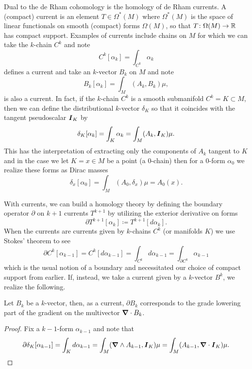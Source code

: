\documentclass[conf]{new-aiaa}
\begin{document}
Dual to the de Rham cohomology is the homology of de Rham currents. A (compact) current is an element $T\in \Omega^*(M)$ where $\Omega^*(M)$ is the space of linear functionals on smooth (compact) forms $\Omega(M)$, so that $T\colon \Omega(M)\to \mathbb{R}$ has compact support. Examples of currents include chains on $M$ for which we can take the $k$-chain $C^k$ and note
\begin{equation}
    C^k[\alpha_k] = \int_{C^k} \alpha_k
\end{equation}
defines a current and take an $k$-vector $B_{k}$ on $M$ and note
\begin{equation}
    B_k[\alpha_k] = \int_M (A_k,B_k) \mu,
\end{equation}
is also a current. In fact, if the $k$-chain $C^k$ is a smooth submanifold $C^k=K\subset M$, then we can define the distributional $k$-vector $\delta_K$ so that it coincides with the tangent pseudoscalar $\boldsymbol{I}_K$ by
\begin{equation}
\delta_K[\alpha_k] = \int_{K} \alpha_k = \int_{M} (A_k, \boldsymbol{I}_K)\mu.
\end{equation}
This has the interpretation of extracting only the components of $A_k$ tangent to $K$ and in the case we let $K=x\in M$ be a point (a $0$-chain) then for a $0$-form $\alpha_0$ we realize these forms as Dirac masses
\begin{equation}
\delta_x[\alpha_0] = \int_M (A_0,\delta_x) \mu = A_0(x).
\end{equation}

With currents, we can build a homology theory \cite{iversen_cauchy_1989} by defining the boundary operator $\partial$ on $k+1$ currents $T^{k+1}$ by utilizing the exterior derivative on forms 
\begin{equation}
\partial T^{k+1}[\alpha_k] \coloneqq T^{k+1}[d\alpha_k].
\end{equation}
When the currents are currents given by $k$-chains $C^k$ (or manifolds $K$) we use Stokes' theorem to see
\begin{equation}
\label{eq:stokes}
\partial C^k[\alpha_{k-1}] = C^k[d\alpha_{k-1}] = \int_{C^k} d\alpha_{k-1} = \int_{\partial C^k} \alpha_{k-1}
\end{equation}
which is the usual notion of a boundary and necessitated our choice of compact support from earlier. If, instead, we take a current given by a $k$-vector $B^k$, we realize the following.
\begin{proposition}
\label{prop:grad_dot}
    Let $B_k$ be a $k$-vector, then, as a current, $\partial B_k$ corresponds to the grade lowering part of the gradient on the multivector $\boldsymbol{\nabla} \cdot B_k$.
\end{proposition}
\begin{proof}
Fix a $k-1$-form $\alpha_{k-1}$ and note that
\begin{align}
    \partial \delta_K [\alpha_{k-1}] = \int_K d\alpha_{k-1}= \int_M(\boldsymbol{\nabla} \wedge A_{k-1},\boldsymbol{I}_K)\mu = \int_M(A_{k-1},\boldsymbol{\nabla} \cdot \boldsymbol{I}_K) \mu.
\end{align}
\end{proof}
\end{document}

